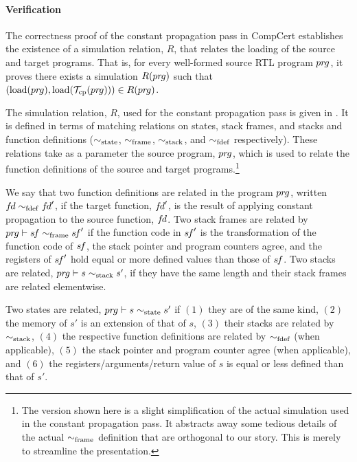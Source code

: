 



\paragraph{Verification}

The correctness proof of the constant propagation pass in CompCert establishes 
the existence of a simulation relation, $R$, that relates the loading of the source and target programs.
That is, for every well-formed source RTL program ${pr\hspace*{-1pt}g}$, it proves 
there exists a simulation $R({pr\hspace*{-1pt}g})$ such that 
$(\mathrm{load}({pr\hspace*{-1pt}g}),\mathrm{load}(\mathcal{T}_\mathrm{cp}({pr\hspace*{-1pt}g})))\in R({pr\hspace*{-1pt}g})$.

The simulation relation, $R$, used for the constant propagation pass is given in
.  It is defined in terms of matching relations on states, stack frames,
and stacks and function definitions ($\sim_{\mathrm{state}}$, $\sim_{\mathrm{frame}}$, $\sim_{\mathrm{stack}}$, and $\sim_{\mathrm{fdef}}$
respectively).  These relations take as a parameter the source program, ${pr\hspace*{-1pt}g}$, which is used to
relate the function definitions of the source and target programs.\footnote{The version shown here
  is a slight simplification of the actual simulation used in the constant propagation pass.  It
  abstracts away some tedious details of the actual $\sim_{\mathrm{frame}}$ definition that are orthogonal to
  our story.  This is merely to streamline the presentation.}

We say that two function definitions are related in the program ${pr\hspace*{-1pt}g}$, written ${f\hspace*{-1pt}d} \sim_{\mathrm{fdef}} {f\hspace*{-1pt}d}'$, 
if the target function, ${f\hspace*{-1pt}d}'$, is the result of applying constant propagation to the source function, ${f\hspace*{-1pt}d}$.
Two stack frames are related by ${pr\hspace*{-1pt}g} \vdash {s\hspace*{-1pt}f}\sim_{\mathrm{frame}} {s\hspace*{-1pt}f}'$ if 
the function code in ${s\hspace*{-1pt}f}'$ is the transformation of the function code of ${s\hspace*{-1pt}f}$,
the stack pointer and program counters agree, and
the registers of ${s\hspace*{-1pt}f}'$ hold equal or more defined values than those of ${s\hspace*{-1pt}f}$.
Two stacks are related, ${pr\hspace*{-1pt}g} \vdash s\sim_{\mathrm{stack}} s'$, if they have the same length and their stack frames are related elementwise.



Two states are related, ${pr\hspace*{-1pt}g} \vdash s \sim_{\mathrm{state}} s'$
if $(1)$ they are of the same kind, 
$(2)$ the memory of $s'$ is an extension of that of $s$, 
$(3)$ their stacks are related by $\sim_{\mathrm{stack}}$,
$(4)$ the respective function definitions are related by $\sim_{\mathrm{fdef}}$ (when applicable),
$(5)$ the stack pointer and program counter agree (when applicable), and
$(6)$ the registers/arguments/return value of $s$ is equal or less defined than that of $s'$. 

